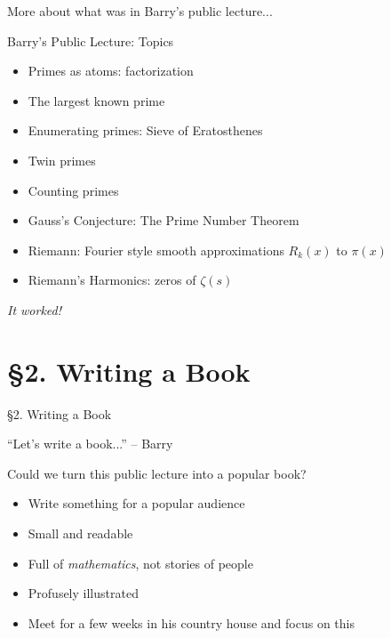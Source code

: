 \documentclass{beamer}
\newcommand{\mysection}[2]{\section{\S#1. #2}%
\begin{frame}{}
\vfill
\begin{center}
\hrulefill
\vfill
\Huge\sc \S#1. #2
\vfill
\hrulefill
\end{center}
\vfill
\end{frame}}
\begin{document}
\begin{frame}{More about what was in Barry's public lecture...}
  \begin{block}{Barry's Public Lecture: Topics}
    \begin{itemize}
      \item Primes as atoms: factorization
      \item The largest known prime
      \item Enumerating primes: Sieve of Eratosthenes
      \item Twin primes
      \item Counting primes
      \item Gauss's Conjecture: The Prime Number Theorem
      \item Riemann: Fourier style smooth approximations $R_k(x)$ to $\pi(x)$
      \item Riemann's Harmonics: zeros of $\zeta(s)$
    \end{itemize}

  \end{block}

  \vfill
  \begin{center}
    \Large
    \emph{It worked!}
  \end{center}



\end{frame}

\mysection{2}{Writing a Book}

\begin{frame}{``Let's write a book...'' -- Barry}
  \begin{block}{Could we turn this public lecture into a popular book?}

    \begin{itemize}
      \item Write something for a popular audience
      \item Small and readable
      \item Full of {\em mathematics}, not stories of people
      \item Profusely illustrated
      \item Meet for a few weeks in his country house and focus on this
    \end{itemize}
  \end{block}
\end{frame}
\end{document}
